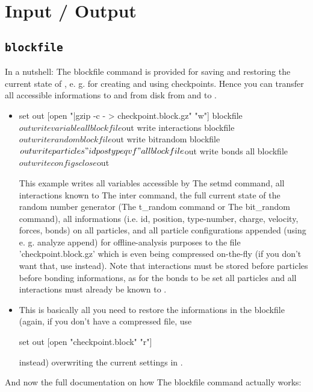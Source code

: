 \chapter{Input / Output}
\label{cha:io}

\section{\texttt{blockfile}}
In a nutshell: The blockfile command is provided for saving and
restoring the current state of \es, e. g. for creating and using
checkpoints. Hence you can transfer all accessible informations to and
from disk from and to \es.

\begin{itemize}
 \item
\begin{code}
set out [open "|gzip -c - > checkpoint.block.gz" "w"]
blockfile $out write variable all
blockfile $out write interactions
blockfile $out write random
blockfile $out write bitrandom
blockfile $out write particles "id pos type q v f" all
blockfile $out write bonds all
blockfile $out write configs
close $out 
\end{code}

This example writes all variables accessible by The setmd command, all
interactions known to The inter command, the full current state of the
random number generator (The t\_random command or The bit\_random
command), all informations (i.e. id, position, type-number, charge,
velocity, forces, bonds) on all particles, and all particle
configurations appended (using e. g. analyze append) for
offline-analysis purposes to the file 'checkpoint.block.gz' which is
even being compressed on-the-fly (if you don't want that, use
instead).
Note that interactions must be stored before particles before bonding
informations, as for the bonds to be set all particles and all
interactions must already be known to \es{}.

 \item
{}
This is basically all you need to restore the informations in the
blockfile (again, if you don't have a compressed file, use
\begin{code}
set out [open "checkpoint.block" "r"]
\end{code}
instead) overwriting the current settings in \es{}.
\end{itemize}
And now the full documentation on how The blockfile command actually
works:

